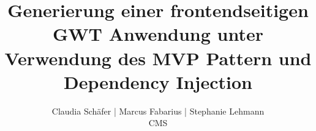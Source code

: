 \documentclass{thesis}
\begin{document}
\title{Generierung einer frontendseitigen GWT Anwendung unter Verwendung
des MVP Pattern und Dependency Injection}
\author{Claudia Schäfer	|	Marcus Fabarius	|	Stephanie Lehmann\\ CMS}












\label{Literaturverzeichnis}


\end{document}
